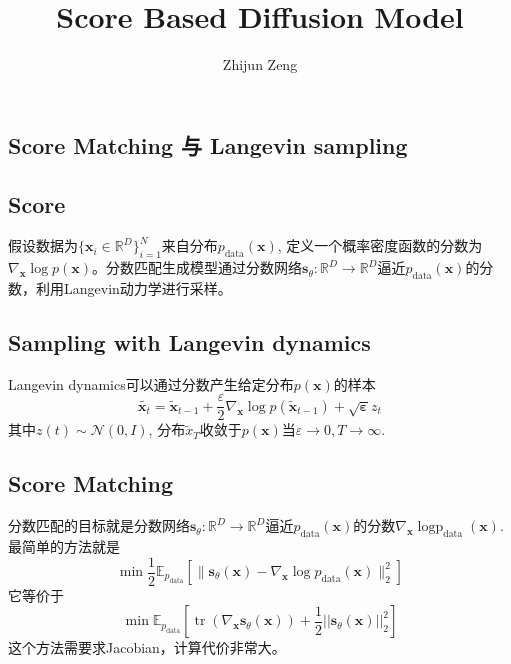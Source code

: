 \documentclass{article}
\newcommand{\tmmathbf}[1]{\ensuremath{\boldsymbol{#1}}}
\newcommand{\tmop}[1]{\ensuremath{\operatorname{#1}}}
\begin{document}
\begin{CJK*}{UTF8}{gbsn}

\title{Score Based Diffusion Model}

\author{Zhijun Zeng}

\maketitle

\section{Score Matching 与 Langevin sampling}

\subsection{Score}

假设数据为$\{ \tmmathbf{x}_i \in \mathbb{R}^D \}_{i =
1}^N$来自分布$p_{\tmop{data}} (\tmmathbf{x})$,
定义一个概率密度函数的分数为$\nabla_{\tmmathbf{x}} \log p
(\tmmathbf{x})$。分数匹配生成模型通过分数网络$\tmmathbf{s}_{\theta}
: \mathbb{R}^D \rightarrow \mathbb{R}^D$逼近$p_{\tmop{data}}
(\tmmathbf{x})$的分数，利用Langevin动力学进行采样。

\subsection{Sampling with Langevin dynamics}

Langevin dynamics可以通过分数产生给定分布$p
(\tmmathbf{x})$的样本
\[ \widetilde{\tmmathbf{x}_t} = \tilde{\tmmathbf{x}}_{t - 1} +
   \frac{\varepsilon}{2} \nabla_{\tmmathbf{x}} \log p (\tilde{\tmmathbf{x}}_{t
   - 1}) + \sqrt{\tmmathbf{\varepsilon}} z_t \]
其中$z (t) \sim \mathcal{N} (0, I)$, 分布$\tilde{x}_T$收敛于$p
(\tmmathbf{x})$当$\varepsilon \rightarrow 0, T \rightarrow \infty$.

\subsection{Score Matching}

分数匹配的目标就是分数网络$\tmmathbf{s}_{\theta} : \mathbb{R}^D
\rightarrow \mathbb{R}^D$逼近$p_{\tmop{data}}
(\tmmathbf{x})$的分数$\nabla_{\tmmathbf{x}} \tmop{logp}_{\tmop{data}}
(\tmmathbf{x})$.最简单的方法就是
\[ \min \frac{1}{2} \mathbb{E}_{p_{\tmop{data}}} [\| \tmmathbf{s}_{\theta}
   (\tmmathbf{x}) - \nabla_{\tmmathbf{x}} \log p_{\tmop{data}} (\tmmathbf{x})
   \|_2^2] \]
它等价于
\[ \min \mathbb{E}_{p_{\tmop{data}}} \left[ \tmop{tr} (\nabla_{\tmmathbf{x}}
   \tmmathbf{s}_{\theta} (\tmmathbf{x})) + \frac{1}{2} | |
   \tmmathbf{s}_{\theta} (\tmmathbf{x}) |  |^2_2 \right] \]
这个方法需要求Jacobian，计算代价非常大。


\end{CJK*}
\end{document}
